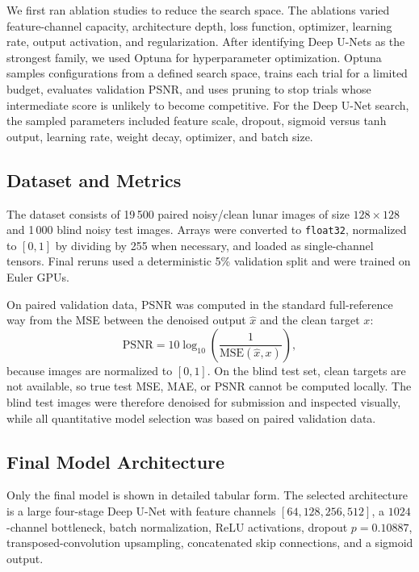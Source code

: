 \documentclass[a4paper,10pt]{article}
\begin{document}
We first ran ablation studies to reduce the search space. The ablations varied feature-channel capacity, architecture depth, loss function, optimizer, learning rate, output activation, and regularization. After identifying Deep U-Nets as the strongest family, we used Optuna for hyperparameter optimization. Optuna samples configurations from a defined search space, trains each trial for a limited budget, evaluates validation PSNR, and uses pruning to stop trials whose intermediate score is unlikely to become competitive. For the Deep U-Net search, the sampled parameters included feature scale, dropout, sigmoid versus tanh output, learning rate, weight decay, optimizer, and batch size.

\subsection{Dataset and Metrics}
The dataset consists of 19\,500 paired noisy/clean lunar images of size $128\times128$ and 1\,000 blind noisy test images. Arrays were converted to \texttt{float32}, normalized to $[0,1]$ by dividing by 255 when necessary, and loaded as single-channel tensors. Final reruns used a deterministic 5\% validation split and were trained on Euler GPUs.

On paired validation data, PSNR was computed in the standard full-reference way from the MSE between the denoised output $\hat{x}$ and the clean target $x$:
\[
\mathrm{PSNR}=10\log_{10}\left(\frac{1}{\mathrm{MSE}(\hat{x},x)}\right),
\]
because images are normalized to $[0,1]$. On the blind test set, clean targets are not available, so true test MSE, MAE, or PSNR cannot be computed locally. The blind test images were therefore denoised for submission and inspected visually, while all quantitative model selection was based on paired validation data.

\subsection{Final Model Architecture}
\label{sec:model_arch}
Only the final model is shown in detailed tabular form. The selected architecture is a large four-stage Deep U-Net with feature channels $[64,128,256,512]$, a $1024$-channel bottleneck, batch normalization, ReLU activations, dropout $p=0.10887$, transposed-convolution upsampling, concatenated skip connections, and a sigmoid output.
\end{document}
